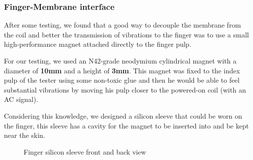 \subsubsection{Finger-Membrane interface}
After some testing, we found that a good way to decouple the membrane from the coil and better the transmission of vibrations to the finger was to use a small high-performance magnet attached directly to the finger pulp.

For our testing, we used an N42-grade neodymium cylindrical magnet with a diameter of \textbf{10mm} and a height of \textbf{3mm}.
This magnet was fixed to the index pulp of the tester using some non-toxic glue and then he would be able to feel substantial vibrations by moving his pulp closer to the powered-on coil (with an AC signal).

Considering this knowledge, we designed a silicon sleeve that could be worn on the finger, this sleeve has a cavity for the magnet to be inserted into and be kept near the skin.
\begin{figure}
    \centering
    \caption{Finger silicon sleeve front and back view}
    \label{fig: finger_sleeve}
\end{figure}

